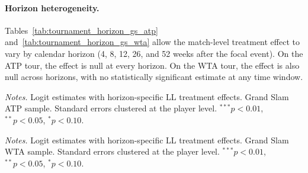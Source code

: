 
\paragraph{Horizon heterogeneity.} Tables~\ref{tab:tournament_horizon_gs_atp} and~\ref{tab:tournament_horizon_gs_wta} allow the match-level treatment effect to vary by calendar horizon (4, 8, 12, 26, and 52 weeks after the focal event). On the ATP tour, the effect is null at every horizon. On the WTA tour, the effect is also null across horizons, with no statistically significant estimate at any time window.

\begin{table}[htbp]
\centering
\caption{Grand Slam Horizon Heterogeneity: ATP}
\label{tab:tournament_horizon_gs_atp}
\begin{threeparttable}
\small

\begin{tablenotes}
\footnotesize
\item \textit{Notes.} Logit estimates with horizon-specific LL treatment effects. Grand Slam ATP sample. Standard errors clustered at the player level. $^{***}p<0.01$, $^{**}p<0.05$, $^{*}p<0.10$.
\end{tablenotes}
\end{threeparttable}
\end{table}

\begin{table}[htbp]
\centering
\caption{Grand Slam Horizon Heterogeneity: WTA}
\label{tab:tournament_horizon_gs_wta}
\begin{threeparttable}
\small

\begin{tablenotes}
\footnotesize
\item \textit{Notes.} Logit estimates with horizon-specific LL treatment effects. Grand Slam WTA sample. Standard errors clustered at the player level. $^{***}p<0.01$, $^{**}p<0.05$, $^{*}p<0.10$.
\end{tablenotes}
\end{threeparttable}
\end{table}

